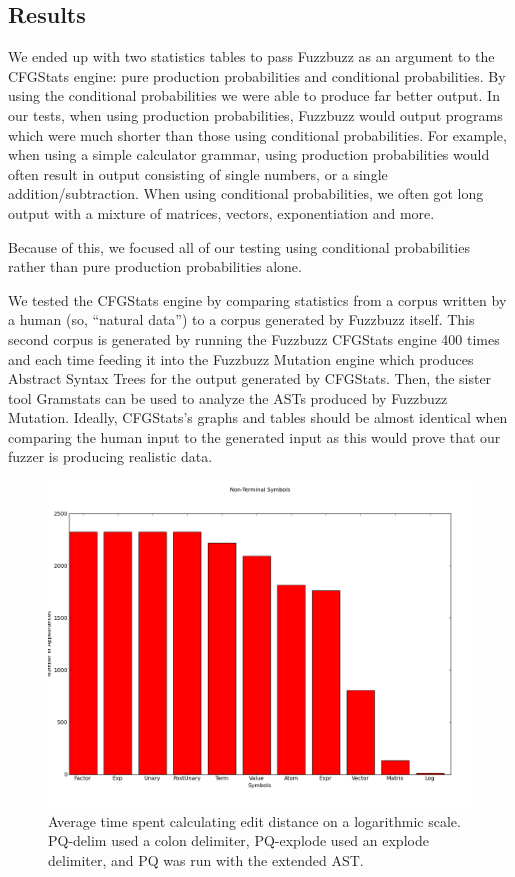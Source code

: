 \subsection{Results}

We ended up with two statistics tables to pass Fuzzbuzz as an argument to the
CFGStats engine: pure production probabilities and conditional probabilities.
By using the conditional probabilities we were able to produce far better
output. In our tests, when using production probabilities, Fuzzbuzz would
output programs which were much shorter than those using conditional
probabilities. For example, when using a simple calculator grammar,
using production probabilities would often result in output consisting of
single numbers, or a single addition/subtraction. When using conditional
probabilities, we often got long output with a mixture of matrices, vectors,
exponentiation and more.

Because of this, we focused all of our testing using conditional probabilities
rather than pure production probabilities alone.

We tested the CFGStats engine by comparing statistics from a corpus written by
a human (so, ``natural data'') to a corpus generated by Fuzzbuzz itself. This
second corpus is generated by running the Fuzzbuzz CFGStats engine 400 times and
each time feeding it into the Fuzzbuzz Mutation engine which produces Abstract
Syntax Trees for the output generated by CFGStats. Then, the sister tool
Gramstats can be used to analyze the ASTs produced by Fuzzbuzz Mutation.
Ideally, CFGStats's graphs and tables should be almost identical when comparing
the human input to the generated input as this would prove that our fuzzer is
producing realistic data.

\begin{figure}
    \begin{center}
        \includegraphics[scale=0.4]{figs/human/nonterm_histogram.png}
    \end{center}
        \caption{Average time spent calculating edit distance on a
                logarithmic scale. PQ-delim used a colon delimiter, PQ-explode
                used an explode delimiter, and PQ was run with the extended
                AST.}
    \label{times}
\end{figure}


